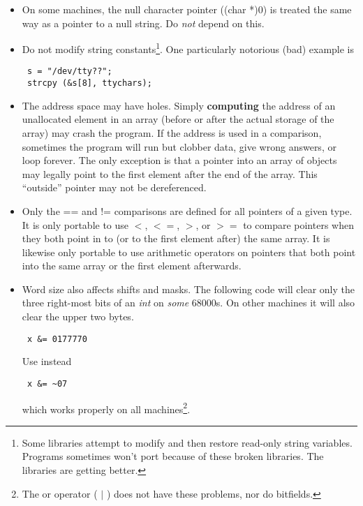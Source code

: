 \begin{itemize}
\begin{verbatim}
        char
 foo (c1, c2, c3)
        char c1, c2, c3;
 {
        char bar = *(&c1 + 1);
        return (bar);                  /* often won't return c2 */
 }
\end{verbatim}

 This example has lots of problems. The stack may grow up or down (indeed,
there need  not even be a stack!). Parameters may be widened when they are
passed, so a char might  be passed as an int, for instance. Arguments may be
pushed left-to-right, right-to-left, in  arbitrary order, or passed in
registers (not pushed at all). The order of evaluation may  differ from the
order in which they are pushed. One compiler may use several (incompatible)
calling conventions.

\item On some machines, the null character pointer ((char *)0) is treated the
same way as a  pointer to a null string. Do {\em not} depend on this. 

\item Do not modify string constants\footnote{Some libraries attempt to modify
and then restore read-only string variables. Programs sometimes won't port
because of these broken libraries. The libraries are getting better.}.
One particularly notorious (bad) example is 
\begin{verbatim}
 s = "/dev/tty??";
 strcpy (&s[8], ttychars); 
\end{verbatim}

\item The address space may have holes. Simply {\bf computing} the address of an
unallocated element in an array (before or after the actual storage of the
array) may crash the program.  If the address is used in a comparison,
sometimes the program will run but clobber data,  give wrong answers, or loop
forever. The only exception is that a pointer into an array of  objects may
legally point to the first element after the end of the array. This ``outside''
 pointer may not be dereferenced. 

\item Only the == and != comparisons are defined for all pointers of a given
type. It is only portable to use $<$, $<=$, $>$, or $>=$ to compare pointers
when they both point in to (or to the first element after) the same array. It is
likewise only portable to use arithmetic operators on pointers that both point
into the same array or the first element afterwards.

\item Word size also affects shifts and masks. The following code will clear
only the three right-most bits of an {\em int} on {\em some} 68000s. On other
machines it will also clear the upper two bytes. 
\begin{verbatim}
 x &= 0177770
\end{verbatim}
 Use instead 
\begin{verbatim}
 x &= ~07
\end{verbatim}
 which works properly on all machines\footnote{The or operator ( $|$ ) does not
have these problems, nor do bitfields.}.


\end{itemize}
